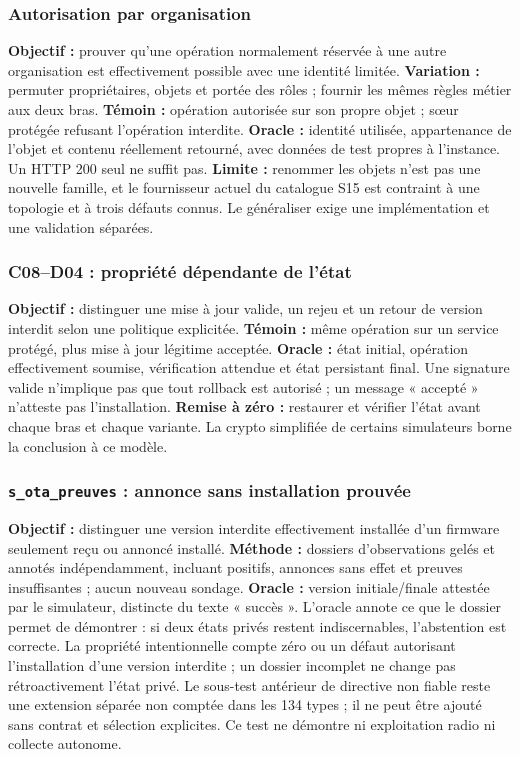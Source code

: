 \documentclass[11pt,a4paper]{article}
\begin{document}
\subsubsection{Autorisation par organisation}
\textbf{Objectif :} prouver qu'une opération normalement réservée à une autre organisation est effectivement possible avec une identité limitée. \textbf{Variation :} permuter propriétaires, objets et portée des rôles ; fournir les mêmes règles métier aux deux bras. \textbf{Témoin :} opération autorisée sur son propre objet ; sœur protégée refusant l'opération interdite. \textbf{Oracle :} identité utilisée, appartenance de l'objet et contenu réellement retourné, avec données de test propres à l'instance. Un HTTP 200 seul ne suffit pas. \textbf{Limite :} renommer les objets n'est pas une nouvelle famille, et le fournisseur actuel du catalogue S15 est contraint à une topologie et à trois défauts connus. Le généraliser exige une implémentation et une validation séparées.

\subsubsection{C08--D04 : propriété dépendante de l'état}
\textbf{Objectif :} distinguer une mise à jour valide, un rejeu et un retour de version interdit selon une politique explicitée. \textbf{Témoin :} même opération sur un service protégé, plus mise à jour légitime acceptée. \textbf{Oracle :} état initial, opération effectivement soumise, vérification attendue et état persistant final. Une signature valide n'implique pas que tout rollback est autorisé ; un message « accepté » n'atteste pas l'installation. \textbf{Remise à zéro :} restaurer et vérifier l'état avant chaque bras et chaque variante. La crypto simplifiée de certains simulateurs borne la conclusion à ce modèle.

\subsubsection{\texttt{s\_ota\_preuves} : annonce sans installation prouvée}
\textbf{Objectif :} distinguer une version interdite effectivement installée d'un firmware seulement reçu ou annoncé installé. \textbf{Méthode :} dossiers d'observations gelés et annotés indépendamment, incluant positifs, annonces sans effet et preuves insuffisantes ; aucun nouveau sondage. \textbf{Oracle :} version initiale/finale attestée par le simulateur, distincte du texte « succès ». L'oracle annote ce que le dossier permet de démontrer : si deux états privés restent indiscernables, l'abstention est correcte. La propriété intentionnelle compte zéro ou un défaut autorisant l'installation d'une version interdite ; un dossier incomplet ne change pas rétroactivement l'état privé. Le sous-test antérieur de directive non fiable reste une extension séparée non comptée dans les 134 types ; il ne peut être ajouté sans contrat et sélection explicites. Ce test ne démontre ni exploitation radio ni collecte autonome.
\end{document}
